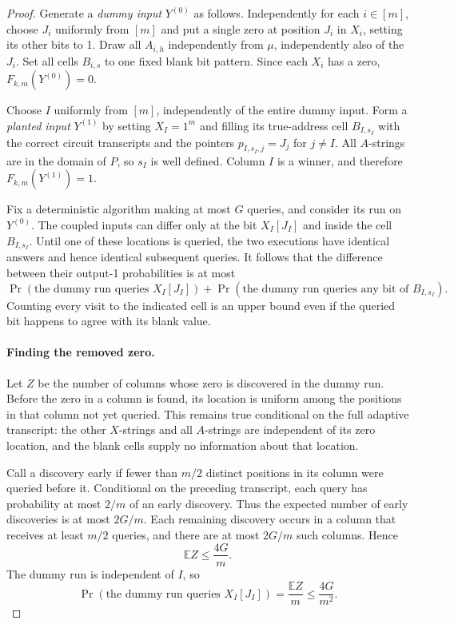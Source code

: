 \begin{proof}
Generate a \emph{dummy input} $Y^{(0)}$ as follows.  Independently for
each $i\in[m]$, choose $J_i$ uniformly from $[m]$ and put a single zero
at position $J_i$ in $X_i$, setting its other bits to 1.  Draw all
$A_{i,h}$ independently from $\mu$, independently also of the $J_i$.
Set all cells $B_{i,s}$ to one fixed blank bit pattern.  Since each $X_i$
has a zero, $F_{k,m}(Y^{(0)})=0$.

Choose $I$ uniformly from $[m]$, independently of the entire dummy
input.  Form a \emph{planted input} $Y^{(1)}$ by setting $X_I=1^m$ and
filling its true-address cell $B_{I,s_I}$ with the correct circuit
transcripts and the pointers $p_{I,s_I,j}=J_j$ for $j\ne I$.
All $A$-strings are in the domain of $P$, so $s_I$ is well defined.
Column $I$ is a winner, and therefore $F_{k,m}(Y^{(1)})=1$.

Fix a deterministic algorithm making at most $G$ queries, and consider
its run on $Y^{(0)}$.  The coupled inputs can differ only at the bit
$X_I[J_I]$ and inside the cell $B_{I,s_I}$.  Until one of these locations
is queried, the two executions have identical answers and hence
identical subsequent queries.  It follows that the difference between
their output-1 probabilities is at most
\begin{equation}\label{eq:coupling-events}
 \Pr(\text{the dummy run queries }X_I[J_I])
 +\Pr(\text{the dummy run queries any bit of }B_{I,s_I}).
\end{equation}
Counting every visit to the indicated cell is an upper bound even if
the queried bit happens to agree with its blank value.

\paragraph{Finding the removed zero.}
Let $Z$ be the number of columns whose zero is discovered in the dummy
run.  Before the zero in a column is found, its location is uniform
among the positions in that column not yet queried.  This remains true
conditional on the full adaptive transcript: the other $X$-strings and
all $A$-strings are independent of its zero location, and the blank
cells supply no information about that location.

Call a discovery early if fewer than $m/2$ distinct positions in its
column were queried before it.  Conditional on the preceding transcript,
each query has probability at most $2/m$ of an early discovery.  Thus
the expected number of early discoveries is at most $2G/m$.  Each
remaining discovery occurs in a column that receives at least $m/2$
queries, and there are at most $2G/m$ such columns.  Hence
\[
 \mathbb E Z\leq\frac{4G}{m}.
\]
The dummy run is independent of $I$, so
\begin{equation}\label{eq:zero-hit}
 \Pr(\text{the dummy run queries }X_I[J_I])
 =\frac{\mathbb E Z}{m}\leq\frac{4G}{m^2}.
\end{equation}


\end{proof}

